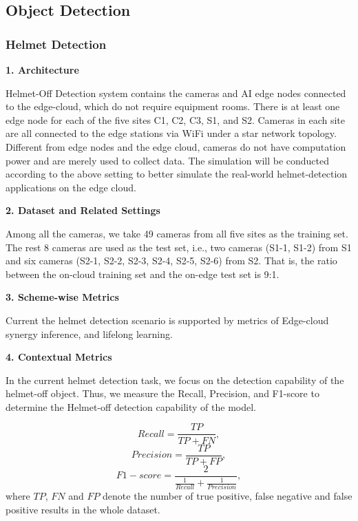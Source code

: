 

\subsection{Object Detection}
\subsubsection{Helmet Detection} 

\noindent
\textbf{1. Architecture} 

Helmet-Off Detection system contains the cameras and AI edge nodes connected to the edge-cloud, which do not require equipment rooms. There is at least one edge node for each of the five sites C1, C2, C3, S1, and S2. Cameras in each site are all connected to the edge stations via WiFi under a star network topology. Different from edge nodes and the edge cloud, cameras do not have computation power and are merely used to collect data. The simulation will be conducted according to the above setting to better simulate the real-world helmet-detection applications on the edge cloud.

\noindent
\textbf{2. Dataset and Related Settings} 

Among all the cameras, we take 49 cameras from all five sites as the training set. The rest 8 cameras are used as the test set, i.e., two cameras (S1-1, S1-2) from S1 and six cameras (S2-1, S2-2, S2-3, S2-4, S2-5, S2-6) from S2. That is, the ratio between the on-cloud training set and the on-edge test set is 9:1. 

\noindent
\textbf{3. Scheme-wise Metrics}

Current the helmet detection scenario is supported by metrics of Edge-cloud synergy inference, and lifelong learning.

\noindent
\textbf{4. Contextual Metrics} 

In the current helmet detection task, we focus on the detection capability of the helmet-off object. Thus, we measure the Recall, Precision, and F1-score to determine the Helmet-off detection capability of the model. 

\begin{equation} \label{equ:recall} 
Recall = \frac{TP}{TP + FN}, 
\end{equation}
\begin{equation} \label{equ:precision} 
Precision = \frac{TP}{TP + FP}, 
\end{equation}
\begin{equation} \label{equ:f1} 
F1-score = \frac{ 2 } {\frac{1}{Recall} + \frac{1}{Precision}},
\end{equation}
where $TP$, $FN$ and $FP$ denote the number of true positive, false negative and false positive results in the whole dataset. 

